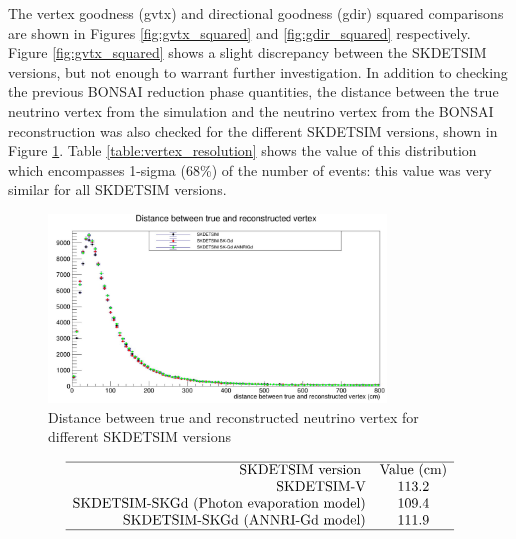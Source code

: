 The vertex goodness (gvtx) and directional goodness (gdir) squared comparisons are shown in Figures \ref{fig:gvtx_squared} and \ref{fig:gdir_squared} respectively. Figure \ref{fig:gvtx_squared} shows a slight discrepancy between the SKDETSIM versions, but not enough to warrant further investigation. In addition to checking the previous BONSAI reduction phase quantities, the distance between the true neutrino vertex from the simulation and the neutrino vertex from the BONSAI reconstruction was also checked for the different SKDETSIM versions, shown in Figure \ref{fig:vertex_resolution}. Table \ref{table:vertex_resolution} shows the value of this distribution which encompasses 1-sigma (68\%) of the number of events: this value was very similar for all SKDETSIM versions.
\begin{figure}

    \includegraphics[width=0.8\textwidth]{Figures/vertex_resolution.png}
    \caption{Distance between true and reconstructed neutrino vertex for different SKDETSIM versions}
    \label{fig:vertex_resolution}

\end{figure}

\begin{table}
    $$
    \begin{array}{rcc}
    \hline \text { SKDETSIM version } & \text{Value (cm)} \\
    \text{SKDETSIM-V} & 113.2\\
    \text{SKDETSIM-SKGd (Photon evaporation model)} & 109.4 \\
    \text{SKDETSIM-SKGd (ANNRI-Gd model)} & 111.9 \\
    \hline
    \end{array}
    $$
\caption{Value of the true neutrino vertex - reconstructed neutrino vertex distribution which encompasses 1-sigma (68\%) of the number of events.}
\label{table:vertex_resolution}
\end{table}

